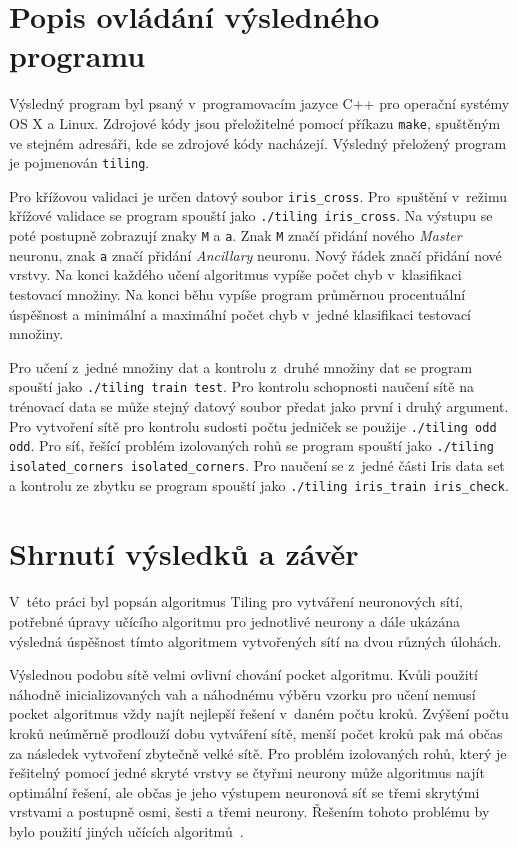\documentclass[a4paper, 11pt]{article}
\begin{document}
\section*{Popis ovládání výsledného programu}
Výsledný program byl psaný v~programovacím jazyce C++ pro operační systémy OS X a Linux. Zdrojové kódy jsou přeložitelné pomocí příkazu {\tt make}, spuštěným ve stejném adresáři, kde se zdrojové kódy nacházejí. Výsledný přeložený program je pojmenován {\tt tiling}.

Pro křížovou validaci je určen datový soubor {\tt iris\_cross}. Pro~spuštění v~režimu křížové validace se program spouští jako {\tt ./tiling iris\_cross}. Na výstupu se poté postupně zobrazují znaky {\tt M} a {\tt a}. Znak {\tt M} značí přidání nového \emph{Master} neuronu, znak {\tt a} značí přidání \emph{Ancillary} neuronu. Nový řádek značí přidání nové vrstvy. Na konci každého učení algoritmus vypíše počet chyb v~klasifikaci testovací množiny. Na konci běhu vypíše program průměrnou procentuální úspěšnost a minimální a maximální počet chyb v~jedné klasifikaci testovací množiny.

Pro učení z~jedné množiny dat a kontrolu z~druhé množiny dat se program spouští jako {\tt ./tiling train test}. Pro kontrolu schopnosti naučení sítě na trénovací data se může stejný datový soubor předat jako první i druhý argument. Pro vytvoření sítě pro kontrolu sudosti počtu jedniček se použije {\tt ./tiling odd odd}. Pro síť, řešící problém izolovaných rohů se program spouští jako {\tt ./tiling isolated\_corners isolated\_corners}. Pro naučení se z~jedné části Iris data set a kontrolu ze zbytku se program spouští jako {\tt ./tiling iris\_train iris\_check}.

\section*{Shrnutí výsledků a závěr}
V~této práci byl popsán algoritmus Tiling pro vytváření neuronových sítí, potřebné úpravy učícího algoritmu pro jednotlivé neurony a dále ukázána výsledná úspěšnost tímto algoritmem vytvořených sítí na dvou různých úlohách.

Výslednou podobu sítě velmi ovlivní chování pocket algoritmu. Kvůli použití náhodně inicializovaných vah a náhodnému výběru vzorku pro učení nemusí pocket algoritmus vždy najít nejlepší řešení v~daném počtu kroků. Zvýšení počtu kroků neúměrně prodlouží dobu vytváření sítě, menší počet kroků pak má občas za následek vytvoření zbytečně velké sítě. Pro problém izolovaných rohů, který je řešitelný pomocí jedné skryté vrstvy se čtyřmi neurony může algoritmus najít optimální řešení, ale občas je jeho výstupem neuronová síť se třemi skrytými vrstvami a postupně osmi, šesti a třemi neurony. Řešením tohoto problému by bylo použití jiných učících algoritmů~\cite{twovariants}.
\end{document}
